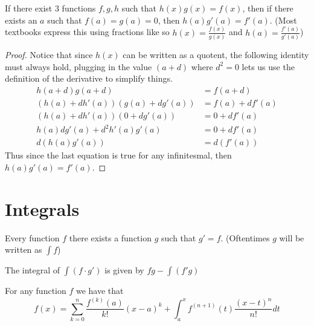 \begin{theorem}
  If there exist 3 functions $f,g,h$ such that $h(x)g(x)=f(x)$, then if there exists an $a$ such that $f(a)=g(a)=0$, then $h(a)g'(a)=f'(a)$. (Most textbooks express this using fractions like so $h(x)=\frac{f(x)}{g(x)}$ and $h(a)=\frac{f'(a)}{g'(a)}$)
\end{theorem}
\begin{proof}
  Notice that since $h(x)$ can be written as a quotent, the following identity must always hold, plugging in the value $(a+d)$ where $d^2=0$ lets us use the definition of the derivative to simplify things.
  \begin{align*}
    h(a+d)g(a+d)&=f(a+d)\\
    (h(a)+dh'(a))(g(a)+dg'(a))&=f(a)+df'(a)\\
    (h(a)+dh'(a))(0+dg'(a))&=0+df'(a)\\
    h(a)dg'(a)+d^2h'(a)g'(a)&=0+df'(a)\\
    d(h(a)g'(a))&=d(f'(a))
  \end{align*}
  Thus since the last equation is true for any infinitesmal, then $h(a)g'(a)=f'(a)$.
\end{proof}
\chapter{Integrals}
\begin{axiom}
  Every function $f$ there exists a function $g$ such that $g'=f$. (Oftentimes $g$ will be written as $\int f$)
\end{axiom}
\begin{theorem}[U Substitution]
  
\end{theorem}
\begin{theorem}
  The integral of $\int (f \cdot g') $ is given by $ fg - \int (f' g)$
\end{theorem}

\begin{theorem}\label{thm:taylor}
  For any function $f$ we have that
  \begin{equation*}
    f(x)=\sum_{k=0}^n \frac{f^{(k)}(a)}{k!}(x-a)^k + \int_a^x f^{(n+1)}(t)\frac{(x-t)^{n}}{n!}dt
  \end{equation*}
\end{theorem}

